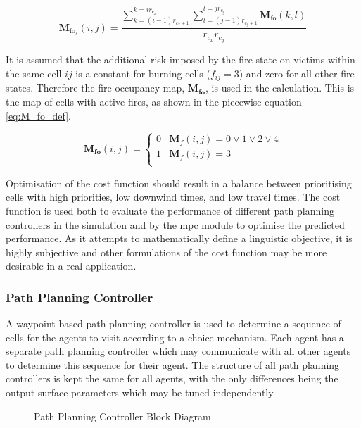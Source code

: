 \documentclass[conference]{IEEEtran}
\begin{document}
\begin{equation} \label{eq:M_fo_coarsened}
    \bm{M}_{\text{fo}_{s}}(i,j) = 
    \frac{\sum_{k=(i-1) r_{c_{x}+1}}^{k=i r_{c_{x}}} \sum_{l=(j-1) r_{c_{y}+1}}^{l=j r_{c_{y}}} \bm{M}_{\text{fo}}(k,l)}{{r_{c_{x}} r_{c_{y}}}}
\end{equation}

It is assumed that the additional risk imposed by the fire state on victims within the same cell $ij$ is a constant for burning cells ($f_{ij} = 3$) and zero for all other fire states.
Therefore the fire occupancy map, $\bm{M_{\text{fo}}}$, is used in the calculation.
This is the map of cells with active fires, as shown in the piecewise equation \ref{eq:M_fo_def}.

\begin{equation} \label{eq:M_fo_def}
    \bm{M_{\text{fo}}}(i,j) = 
    \begin{cases}
        0 & \bm{M}_{f}(i,j) = 0 \lor 1 \lor 2 \lor 4 \\
        1 & \bm{M}_{f}(i,j) = 3 \\
    \end{cases}
\end{equation}

Optimisation of the cost function should result in a balance between prioritising cells with high priorities, low downwind times, and low travel times.
The cost function is used both to evaluate the performance of different path planning controllers in the simulation and by the \gls{mpc} module to optimise the predicted performance.
As it attempts to mathematically define a linguistic objective, it is highly subjective and other formulations of the cost function may be more desirable in a real application.
 
\subsubsection{Path Planning Controller} \label{subsubsec:pathplanningController}

A waypoint-based path planning controller is used to determine a sequence of cells for the agents to visit according to a choice mechanism.
Each agent has a separate path planning controller which may communicate with all other agents to determine this sequence for their agent.
The structure of all path planning controllers is kept the same for all agents, with the only differences being the output surface parameters which may be tuned independently.

\begin{figure*}
    \centering
    
    \caption{Path Planning Controller Block Diagram}
    \label{fig:diagram_path_planner}
\end{figure*}
\end{document}
